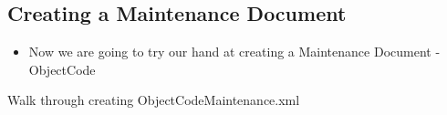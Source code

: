 \begin{ifhtml}
\begin{s5slide}
        \section{Creating a Maintenance Document}
            \begin{itemize}
                \item Now we are going to try our hand at creating a Maintenance Document - ObjectCode
            \end{itemize}
            \begin{s5notes}
                Walk through creating ObjectCodeMaintenance.xml
            \end{s5notes}
    \end{s5slide}
\end{ifhtml}